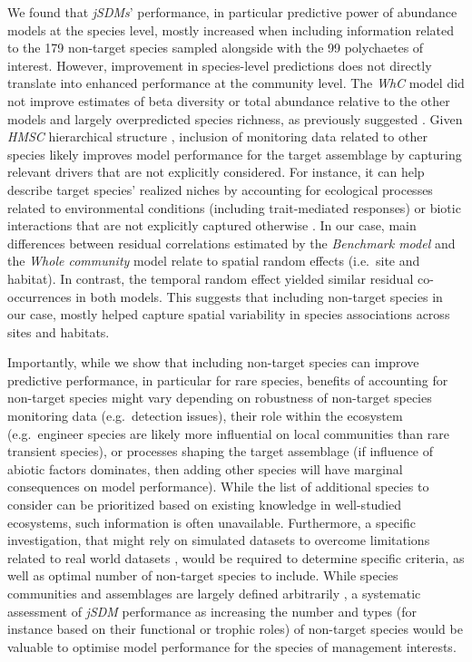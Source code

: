 \begin{refsection}
We found that \emph{jSDMs}' performance, in particular predictive power
of abundance models at the species level, mostly increased when
including information related to the 179 non-target species sampled
alongside with the 99 polychaetes of interest. However, improvement in
species-level predictions does not directly translate into enhanced
performance at the community level. The \emph{WhC} model did not improve
estimates of beta diversity or total abundance relative to the other
models and largely overpredicted species richness, as previously
suggested \autocite{Zurell_2018}. Given \emph{HMSC} hierarchical
structure \autocite{Poggiato_2021}, inclusion of monitoring data related
to other species likely improves model performance for the target
assemblage by capturing relevant drivers that are not explicitly
considered. For instance, it can help describe target species' realized
niches by accounting for ecological processes related to environmental
conditions (including trait-mediated responses) or biotic interactions
that are not explicitly captured otherwise \autocite{Ovaskainen_2017a}.
In our case, main differences between residual correlations estimated by
the \emph{Benchmark model} and the \emph{Whole community} model relate
to spatial random effects (i.e.~site and habitat). In contrast, the
temporal random effect yielded similar residual co-occurrences in both
models. This suggests that including non-target species in our case,
mostly helped capture spatial variability in species associations across
sites and habitats.

Importantly, while we show that including non-target species can improve
predictive performance, in particular for rare species, benefits of
accounting for non-target species might vary depending on robustness of
non-target species monitoring data (e.g.~detection issues), their role
within the ecosystem (e.g.~engineer species are likely more influential
on local communities than rare transient species), or processes shaping
the target assemblage (if influence of abiotic factors dominates, then
adding other species will have marginal consequences on model
performance). While the list of additional species to consider can be
prioritized based on existing knowledge in well-studied ecosystems, such
information is often unavailable. Furthermore, a specific investigation,
that might rely on simulated datasets to overcome limitations related to
real world datasets \autocite{DiRenzo_2022}, would be required to
determine specific criteria, as well as optimal number of non-target
species to include. While species communities and assemblages are
largely defined arbitrarily \autocite{Stroud_2015}, a systematic
assessment of \emph{jSDM} performance as increasing the number and types
(for instance based on their functional or trophic roles) of non-target
species would be valuable to optimise model performance for the species
of management interests.


\end{refsection}
